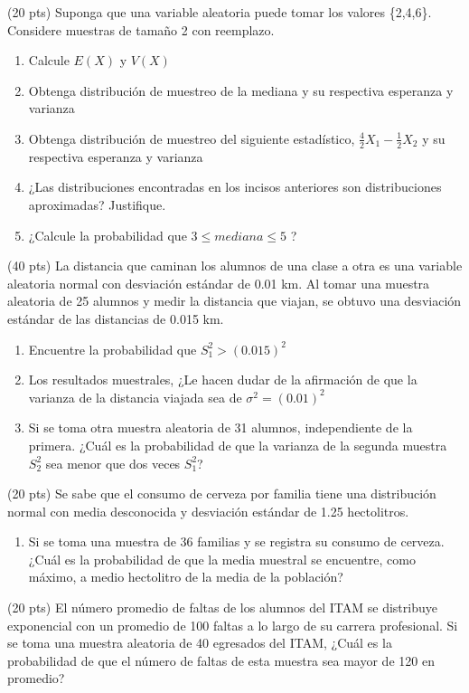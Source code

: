 \documentclass[addpoints]{exam}
\theoremstyle{mytheor}
\begin{document}
  
  \begin{questions} 
  \question (20 pts) Suponga que una variable aleatoria puede tomar los valores \{2,4,6\}. Considere muestras de tamaño 2 con reemplazo.
  
  \begin{enumerate}
  \item Calcule $E(X)$ y $V(X)$
  \item Obtenga distribución de muestreo de la mediana  y su respectiva esperanza y varianza
  \item Obtenga distribución de muestreo del siguiente estadístico, $\frac{4}{2}X_1-\frac{1}{2}X_2$ y su respectiva esperanza y varianza
  \item ¿Las distribuciones encontradas en los incisos anteriores son distribuciones aproximadas? Justifique.
  \item ¿Calcule la probabilidad que $3 \leq mediana \leq 5$ ?
  \end{enumerate}
  
  \question (40 pts) 
  La distancia que caminan los alumnos de una clase a otra es una variable aleatoria normal con desviación estándar de 0.01 km. Al tomar una muestra aleatoria de 25 alumnos y medir la distancia que viajan, se obtuvo una desviación estándar de las distancias de 0.015 km. 
  
  \begin{enumerate}
  \item Encuentre la probabilidad que $S_1^2 > (0.015)^2$
  \item Los resultados muestrales, ¿Le hacen dudar de la afirmación de que la varianza de la distancia viajada sea de $\sigma^2 = (0.01)^2$
  \item Si se toma otra muestra aleatoria de 31 alumnos, independiente de la primera. ¿Cuál es la probabilidad de que la varianza de la segunda muestra $S_2^2$ sea menor que dos veces $S_1^2$?
  \end{enumerate}
  
  \question (20 pts) 
  Se sabe que el consumo de cerveza por familia tiene una distribución normal con media desconocida y desviación estándar de 1.25 hectolitros. 
  \begin{enumerate}
  \item Si se toma una muestra de 36 familias y se registra su consumo de cerveza. ¿Cuál es la probabilidad de que la media muestral se encuentre, como máximo, a medio hectolitro de la media de la población?
  \end{enumerate}

  \question (20 pts) 
El número promedio de faltas de los alumnos del ITAM se distribuye exponencial con un promedio de 100 faltas a lo largo de su carrera profesional. Si se toma una muestra aleatoria de 40 egresados del ITAM, ¿Cuál es la probabilidad de que el número de faltas de esta muestra sea mayor de 120 en promedio?
\end{questions}
 
\end{document}
